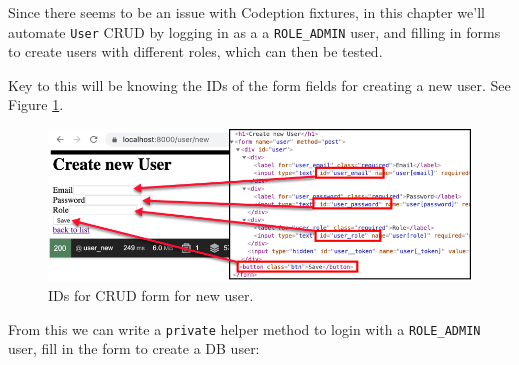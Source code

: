 \documentclass[a4paperpaper,openright]{book}
\newenvironment{Shaded}{}{}
\newcommand{\KeywordTok}[1]{\textcolor[rgb]{0.00,0.44,0.13}{\textbf{#1}}}
\newcommand{\NormalTok}[1]{#1}
\newcommand{\OtherTok}[1]{\textcolor[rgb]{0.00,0.44,0.13}{#1}}
\newcommand{\StringTok}[1]{\textcolor[rgb]{0.25,0.44,0.63}{#1}}
\begin{document}
Since there seems to be an issue with Codeption fixtures, in this
chapter we'll automate \texttt{User} CRUD by logging in as a a
\texttt{ROLE\_ADMIN} user, and filling in forms to create users with
different roles, which can then be tested.

Key to this will be knowing the IDs of the form fields for creating a
new user. See Figure \ref{userFormIds}.

\begin{figure}
\centering
\includegraphics{./tex2pdf.-d01fd108a306454d/f9bb64b599a83634a12f2e664a4385ae995bcf09.png}
\caption{IDs for CRUD form for new user. \label{userFormIds}}
\end{figure}

From this we can write a \texttt{private} helper method to login with a
\texttt{ROLE\_ADMIN} user, fill in the form to create a DB user:

\begin{Shaded}
\end{Shaded}
\end{document}
